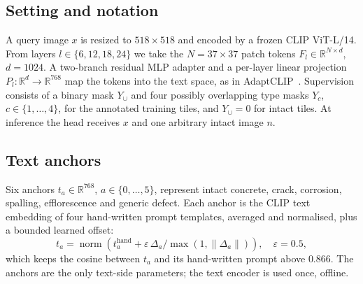 \documentclass[conference]{IEEEtran}
\begin{document}
\subsection{Setting and notation}
A query image $x$ is resized to $518\times518$ and encoded by a frozen CLIP ViT-L/14. From layers $l\in\{6,12,18,24\}$ we take the $N=37\times37$ patch tokens $F_l\in\mathbb{R}^{N\times d}$, $d=1024$. A two-branch residual MLP adapter and a per-layer linear projection $P_l:\mathbb{R}^d\to\mathbb{R}^{768}$ map the tokens into the text space, as in AdaptCLIP~\cite{adaptclip}. Supervision consists of a binary mask $Y_\cup$ and four possibly overlapping type masks $Y_c$, $c\in\{1,\dots,4\}$, for the annotated training tiles, and $Y_\cup=0$ for intact tiles. At inference the head receives $x$ and one arbitrary intact image $n$.

\subsection{Text anchors}
Six anchors $t_a\in\mathbb{R}^{768}$, $a\in\{0,\dots,5\}$, represent intact concrete, crack, corrosion, spalling, efflorescence and generic defect. Each anchor is the CLIP text embedding of four hand-written prompt templates, averaged and normalised, plus a bounded learned offset:
\begin{equation}
t_a=\operatorname{norm}\!\left(t_a^{\mathrm{hand}}+\varepsilon\,\Delta_a/\max(1,\|\Delta_a\|)\right),\quad \varepsilon=0.5,
\end{equation}
which keeps the cosine between $t_a$ and its hand-written prompt above $0.866$. The anchors are the only text-side parameters; the text encoder is used once, offline.
\end{document}
